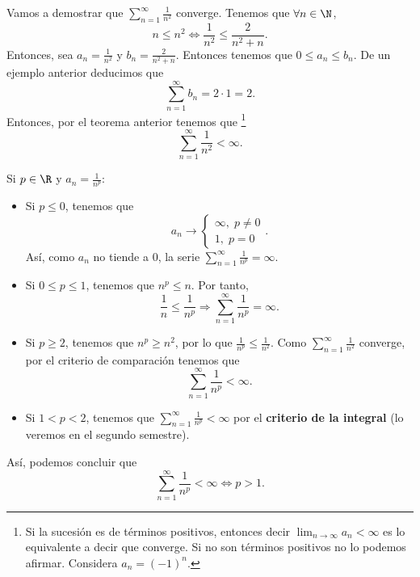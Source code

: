 \begin{eg}
\normalfont Vamos a demostrar que $\displaystyle \sum^{\infty}_{n = 1} \frac{1}{n^{2}} $ converge. Tenemos que $\displaystyle \forall n \in \N $, 
\[n \leq n^{2} \iff \frac{1}{n^{2}} \leq \frac{2}{n^{2}+n} .\]
Entonces, sea $\displaystyle a_{n} = \frac{1}{n^{2}} $ y $\displaystyle b_{n} = \frac{2}{n^{2}+n} $. Entonces tenemos que $\displaystyle 0 \leq a_{n} \leq b_{n} $. De un ejemplo anterior deducimos que 
\[\sum^{\infty}_{n=1}b_{n} = 2 \cdot 1 = 2 .\]
Entonces, por el teorema anterior tenemos que \footnote{Si la sucesión es de términos positivos, entonces decir $\displaystyle \lim_{n \to \infty}a_{n} < \infty $ es lo equivalente a decir que converge. Si no son términos positivos no lo podemos afirmar. Considera $\displaystyle a_{n} = \left(-1\right)^{n} $.} 
\[\sum^{\infty}_{n = 1}\frac{1}{n^{2}} < \infty .\]
\end{eg}
\begin{eg}
\normalfont Si $\displaystyle p \in \R $ y $\displaystyle a_{n} = \frac{1}{n^{p}} $:
\begin{itemize}
\item Si $\displaystyle p \leq 0 $, tenemos que 
	\[a_{n} \to 
	\begin{cases}
	\infty, \; p\neq 0 \\
	1, \; p = 0
	\end{cases}
	.\]
Así, como $\displaystyle a_{n} $ no tiende a $\displaystyle 0 $, la serie $\displaystyle \sum^{\infty}_{n = 1}\frac{1}{n^{p}} = \infty $.
\item Si $\displaystyle 0 \leq p \leq 1 $, tenemos que $\displaystyle n^{p} \leq n $. Por tanto, 
	\[\frac{1}{n} \leq \frac{1}{n^{p}} \Rightarrow \sum^{\infty}_{n=1}\frac{1}{n^{p}} = \infty .\]
\item Si $\displaystyle p \geq 2 $, tenemos que $\displaystyle n^{p} \geq n^{2} $, por lo que $\displaystyle \frac{1}{n^{p}} \leq \frac{1}{n^{2}} $. Como $\displaystyle \sum^{\infty}_{n=1}\frac{1}{n^{2}} $ converge, por el criterio de comparación tenemos que 
	\[\sum^{\infty}_{n = 1}\frac{1}{n^{p}} < \infty .\]
\item Si $\displaystyle 1 < p < 2 $, tenemos que $\displaystyle \sum^{\infty}_{n = 1}\frac{1}{n^{p}}<\infty $ por el \textbf{criterio de la integral} (lo veremos en el segundo semestre).
\end{itemize}
\end{eg}

\begin{observation}
\normalfont Así, podemos concluir que 
\[\sum^{\infty}_{n = 1}\frac{1}{n^{p}} < \infty \iff p > 1 .\]
\end{observation}

